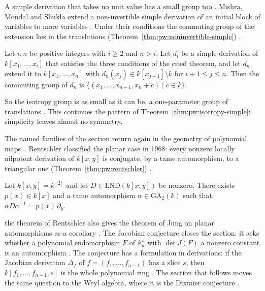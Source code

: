 A simple derivation that takes no unit value has a small group too
\cite[p.~1]{MishraMondalShukla2025Simple}. Mishra, Mondal and Shukla extend a
non-invertible simple derivation of an initial block of variables to more
variables \cite[p.~1]{MishraMondalShukla2025Simple}. Under their conditions
the commuting group of the extension lies in the translations
(Theorem~\ref{thm:pw:noninvertible-simple}) \cite[Theorem~2.4,
p.~5]{MishraMondalShukla2025Simple}.\begin{theorem}\label{thm:pw:noninvertible-simple} Let
$i,n$ be positive integers with $i\geq 2$ and $n>i$. Let $d_{i}$ be a simple
derivation of $k[x_{1},\dots,x_{i}]$ that satisfies the three conditions of
the cited theorem, and let $d_{n}$ extend it to $k[x_{1},\dots,x_{n}]$ with
$d_{n}(x_{j})\in k[x_{j-1}]\setminus k$ for $i+1\leq j\leq n$. Then the
commuting group of $d_{n}$ is $\{(x_{1},\dots,x_{n-1},x_{n}+c)\mid c\in k\}$.
\end{theorem}

So the isotropy group is as small as it can be, a one-parameter group of
translations \cite[p.~1]{MishraMondalShukla2025Simple}. This continues the
pattern of Theorem~\ref{thm:pw:isotropy-simple}: simplicity leaves almost no
symmetry.

The named families of the section return again in the geometry of polynomial
maps~\cite[Theorem~4.1,
p.~113]{Freudenburg2017}. Rentschler classified the planar case in 1968: every nonzero locally
nilpotent derivation of $k[x,y]$ is conjugate, by a tame automorphism, to a
triangular one (Theorem~\ref{thm:pw:rentschler}) \cite[Theorem~4.1,
p.~113]{Freudenburg2017}.

\begin{theorem}\label{thm:pw:rentschler}
Let $k[x,y]=k^{[2]}$ and let $D\in\mathrm{LND}(k[x,y])$ be nonzero. There
exists $p(x)\in k[x]$ and a tame automorphism $\alpha\in\mathrm{GA}_{2}(k)$
such that $\alpha D\alpha^{-1}=p(x)\,\partial_{y}$.
\end{theorem}

the theorem of Rentschler also gives the theorem of Jung on planar
automorphisms as a corollary \cite[p.~113]{Freudenburg2017}. The Jacobian
conjecture closes the section: it asks whether a polynomial endomorphism $F$
of $\mathbb{A}^{n}_{k}$ with $\det J(F)$ a nonzero constant is an automorphism
\cite[p.~1]{BelovKanelKontsevich2007}. The conjecture has a formulation in
derivations: if the Jacobian derivation $\Delta_{f}$ of
$f=(f_{1},\dots,f_{n-1})$ has a slice $s$, then $k[f_{1},\dots,f_{n-1},s]$ is
the whole polynomial ring \cite[p.~81]{Freudenburg2017}. The section that
follows moves the same question to the Weyl algebra, where it is the Dixmier
conjecture \cite[p.~241]{Dixmier1968}.

